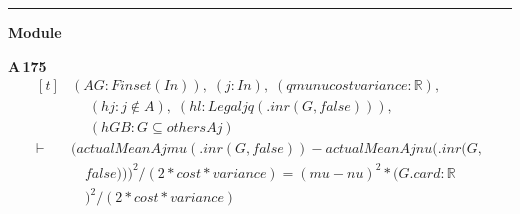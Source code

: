\vspace{4pt}\noindent\rule{\columnwidth}{0.4pt}\par\vspace{2pt}
\noindent\textbf{Module }\par\vspace{3pt}

\noindent\textbf{A\,175}\quad{}
{\footnotesize\[ \begin{aligned}[t]
&(\mathit{A} \mathit{G} : \mathit{Finset} (\mathit{I} \mathit{n})),\; (\mathit{j} : \mathit{I} \mathit{n}),\; (\mathit{q} \mathit{mu} \mathit{nu} \mathit{cost} \mathit{variance} : \mathbb{R} ),\\
&\quad \; (\mathit{hj} : \mathit{j} \notin \mathit{A}),\; (\mathit{hl} : \mathit{Legal} \mathit{j} \mathit{q} (.\mathit{inr} (\mathit{G},\mathit{false}))),\\
&\quad \; (\mathit{hGB} : \mathit{G} \subseteq \mathit{others} \mathit{A} \mathit{j})\\
\vdash\;&(\mathit{actualMean} \mathit{A} \mathit{j} \mathit{mu} (.\mathit{inr} (\mathit{G},\mathit{false}))-\mathit{actualMean} \mathit{A} \mathit{j} \mathit{nu} (.\mathit{inr} (\mathit{G},\\
&\quad \mathit{false})))^{2}/ (2*\mathit{cost}*\mathit{variance}) = (\mathit{mu}-\mathit{nu})^{2}*(\mathit{G}.\mathit{card}:\mathbb{R}\\
&\quad )^{2}/(2*\mathit{cost}*\mathit{variance})
\end{aligned} \]}

